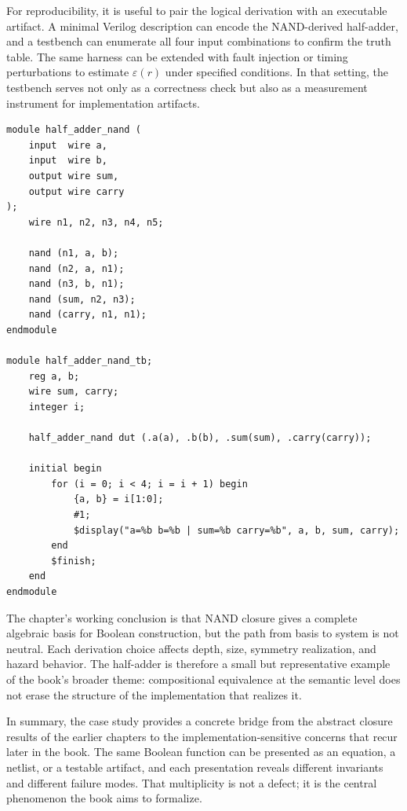 \documentclass[11pt]{article}
\begin{document}
For reproducibility, it is useful to pair the logical derivation with an executable artifact. A minimal Verilog description can encode the NAND-derived half-adder, and a testbench can enumerate all four input combinations to confirm the truth table. The same harness can be extended with fault injection or timing perturbations to estimate \(\varepsilon(r)\) under specified conditions. In that setting, the testbench serves not only as a correctness check but also as a measurement instrument for implementation artifacts.

\begin{verbatim}
module half_adder_nand (
    input  wire a,
    input  wire b,
    output wire sum,
    output wire carry
);
    wire n1, n2, n3, n4, n5;

    nand (n1, a, b);
    nand (n2, a, n1);
    nand (n3, b, n1);
    nand (sum, n2, n3);
    nand (carry, n1, n1);
endmodule

module half_adder_nand_tb;
    reg a, b;
    wire sum, carry;
    integer i;

    half_adder_nand dut (.a(a), .b(b), .sum(sum), .carry(carry));

    initial begin
        for (i = 0; i < 4; i = i + 1) begin
            {a, b} = i[1:0];
            #1;
            $display("a=%b b=%b | sum=%b carry=%b", a, b, sum, carry);
        end
        $finish;
    end
endmodule
\end{verbatim}

The chapter’s working conclusion is that NAND closure gives a complete algebraic basis for Boolean construction, but the path from basis to system is not neutral. Each derivation choice affects depth, size, symmetry realization, and hazard behavior. The half-adder is therefore a small but representative example of the book’s broader theme: compositional equivalence at the semantic level does not erase the structure of the implementation that realizes it.

In summary, the case study provides a concrete bridge from the abstract closure results of the earlier chapters to the implementation-sensitive concerns that recur later in the book. The same Boolean function can be presented as an equation, a netlist, or a testable artifact, and each presentation reveals different invariants and different failure modes. That multiplicity is not a defect; it is the central phenomenon the book aims to formalize.
\end{document}
